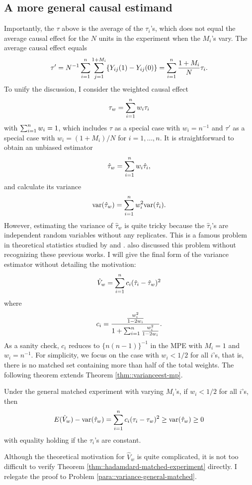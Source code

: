 \subsection{A more general causal estimand}


Importantly, the $\tau$ above is the average of the $\tau_i$'s, which does not equal the average causal effect for the $N$ units in the experiment when the $M_i$'s vary. The average causal effect equals
$$
\tau' = N^{-1} \sum_{i=1}^n \sum_{j=1}^{1+M_i} \{ Y_{ij}(1)-Y_{ij}(0) \} = \sum_{i=1}^n \frac{1+M_i}{N} \tau_i.
$$ 
To unify the discussion, I consider the weighted causal effect
$$
\tau_w =  \sum_{i=1}^n w_i \tau_i
$$
with $\sum_{i=1}^n w_i = 1$, 
which includes $\tau$ as a special case with $w_i = n^{-1}$ and $\tau'$ as a special case with $w_i = (1+M_i)/N $ for $i=1,\ldots, n$. It is straightforward to obtain an unbiased estimator 
$$
\hat\tau_w =  \sum_{i=1}^n w_i \hat\tau_i,
$$
and calculate its variance 
$$
\textup{var}(\hat\tau_w ) = \sum_{i=1}^n w_i^2 \textup{var} (\hat\tau_i ). 
$$
However, estimating the variance of $\hat\tau_w $ is quite tricky because the $\hat\tau_i$'s are independent random variables without any replicates. This is a famous problem in theoretical statistics studied by \citet{hartley1969variance} and \citet{rao1970estimation}. \citet{fogarty2018mitigating} also discussed this problem without recognizing these previous works. I will give the final form of the variance estimator without detailing the motivation:
$$
\hat{V}_w = \sum_{i=1}^n c_i (\hat\tau_i -\hat\tau_w )  ^2
$$
where 
$$
c_i = \frac{    \frac{w_i^2}{1-2w_i}   }{   1 + \sum_{i=1}^n  \frac{w_i^2}{1-2w_i} }.
$$
As a sanity check, $c_i $ reduces to $ \{  n(n-1) \}^{-1}$ in the MPE with $M_i=1$ and $w_i = n^{-1}$. For simplicity, we focus on the case with $w_i < 1/2$ for all $i$'s, that is, there is no matched set containing more than half of the total weights. The following theorem extends Theorem \ref{thm::varianceest-mp}.  

\begin{theorem}
\label{thm::hadamdard-matched-experiment}
Under the general matched experiment with varying $M_i$'s, if $w_i < 1/2$ for all $i$'s, then  
 $$
 E(\hat{V}_w ) - \textup{var}( \hat\tau_w  ) = \sum_{i=1}^n c_i (\tau_i - \tau_w )^2 \geq \textup{var}( \hat\tau_w  )  \geq 0
 $$
with equality holding if the $\tau_i $'s are constant. 
\end{theorem}

Although the theoretical motivation for $\hat{V}_w $ is quite complicated, it is not too difficult to verify Theorem \ref{thm::hadamdard-matched-experiment} directly. I relegate the proof to Problem \ref{para::variance-general-matched}. 
 



